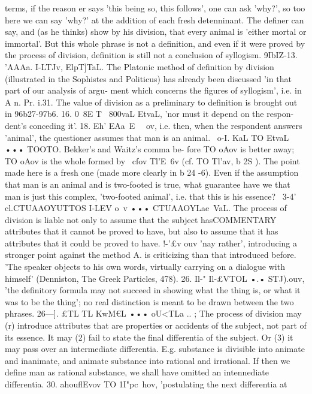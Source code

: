 {{{{{{{{{{{{{{{{{{{{terms, if the reason er says 'this being so, this follows', one can
ask 'why?', so too here we can say 'why?' at the addition of
each fresh detenninant. The definer can say, and (as he thinks)
show by his division, that every animal is 'either mortal or
immortal'. But this whole phrase is not a definition, and even
if it were proved by the process of division, definition is still not
a conclusion of syllogism.
9IbIZ-13. 'AAAa. I-LTJv,
ElpT]TaL. The Platonic method of
definition by division (illustrated in the Sophistes and Politicus)
has already been discussed 'in that part of our analysis of argu-
ment which concerns the figures of syllogism', i.e. in A n. Pr.
i.31. The value of division as a preliminary to definition is brought
out in 96b27-97b6.
16. 0~8E T~ 800vaL EtvaL, 'nor must it depend on the respon-
dent's conceding it'.
18. Eh' EAa~E ~~ov, i.e. then, when the respondent answers
'animal', the questioner assumes that man is an animal.
~o-I. KaL TO EtvaL ••• TOOTO. Bekker's and Waitz's comma be-
fore TO oAov is better away; TO oAov is the whole formed by ~cfov
Tl'E~6v (cf. TO Tl'av, b 2S ). The point made here is a fresh one (made
more clearly in b 24 -6). Even if the assumption that man is an
animal and is two-footed is true, what guarantee have we that
man is just this complex, 'two-footed animal', i.e. that this is
his essence?
~3-4' cl.CTUAAOYUTTOS I-LEV o~v ••• CTUAAOYLae~VaL. The process
of division is liable not only to assume that the subject hasCOMMENTARY
attributes that it cannot be proved to have, but also to assume
that it has attributes that it could be proved to have.
!-'£v ouv 'nay rather', introducing a stronger point against the
method A. is criticizing than that introduced before. 'The
speaker objects to his own words, virtually carrying on a dialogue
with himself' (Denniston, The Greek Particles, 478).
26. Il-" Il-£VTOL •.• STJ).ouv, 'the definitory formula may not
succeed in showing what the thing is, or what it was to be the
thing'; no real distinction is meant to be drawn between the two
phrases.
26---]. £TL TL KwM€L ••• oU<TLa .. ; The process of division may (r)
introduce attributes that are properties or accidents of the subject,
not part of its essence. It may (2) fail to state the final differentia
of the subject. Or (3) it may pass over an intermediate differentia.
E.g. substance is divisible into animate and inanimate, and
animate substance into rational and irrational. If then we define
man as rational substance, we shall have omitted an intennediate
differentia.
30. ahouflEvov TO 1I"pc~hov, 'postulating the next differentia at
}}}}}}}}}}}}}}}}}}}}
